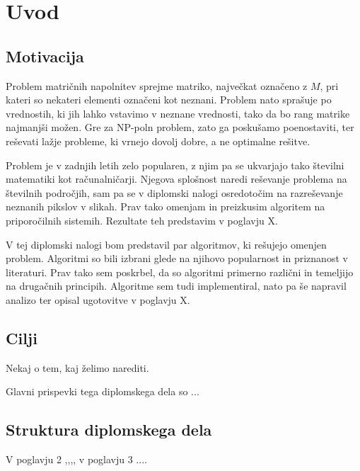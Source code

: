 \chapter{Uvod}

\section{Motivacija}
Problem matričnih napolnitev sprejme matriko, največkat označeno z $M$, pri kateri so nekateri elementi označeni kot neznani. Problem nato sprašuje po vrednostih, ki jih lahko vstavimo v neznane vrednosti, tako da bo rang matrike najmanjši možen. Gre za NP-poln problem, zato ga poskušamo poenostaviti, ter reševati lažje probleme, ki vrnejo dovolj dobre, a ne optimalne rešitve. 

Problem je v zadnjih letih zelo popularen, z njim pa se ukvarjajo tako številni matematiki kot računalničarji. Njegova splošnost naredi reševanje problema na številnih področjih, sam pa se v diplomski nalogi osredotočim na razreševanje neznanih pikslov v slikah. Prav tako omenjam in preizkusim algoritem na priporočilnih sistemih. Rezultate teh predstavim v poglavju X.

V tej diplomski nalogi bom predstavil par  algoritmov, ki rešujejo omenjen problem. Algoritmi so bili izbrani glede na njihovo popularnost in priznanost v literaturi. Prav tako sem poskrbel, da so algoritmi primerno različni in temeljijo na drugačnih principih. Algoritme sem tudi implementiral, nato pa še napravil analizo ter opisal ugotovitve v poglavju X.

\section{Cilji}

Nekaj o tem, kaj želimo narediti.

Glavni prispevki tega diplomskega dela so ...

\section{Struktura diplomskega dela}

V poglavju 2 ,,,, v poglavju 3 ....